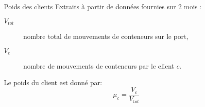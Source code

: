 \begin{frame}{Poids des clients}
  Extraits à partir de données fournies sur 2 mois : 
  \vfill
  \begin{description}
  \item[$V_{tot}$] nombre total de mouvements de conteneurs sur le port,
  \item[$V_c$] nombre de mouvements de conteneurs par le client $c$.
  \end{description}
  \vfill
  Le poids du client est donné par:
  \begin{equation*}
    \mu_c = \frac{V_c}{V_{tot}}
  \end{equation*}
\end{frame} 
